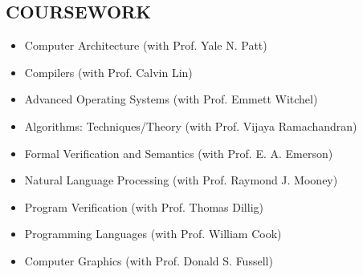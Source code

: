 \documentclass[margin, 9pt]{res} %
\begin{document}
\begin{resume}

\section{COURSEWORK} 

\vspace*{-2pt}
\begin{itemize}[leftmargin=*] \itemsep -2pt
	\item Computer Architecture (with Prof. Yale N. Patt)
	\item Compilers (with Prof. Calvin Lin)
	\item Advanced Operating Systems (with Prof. Emmett Witchel)
	\item Algorithms: Techniques/Theory (with Prof. Vijaya Ramachandran)
	\item Formal Verification and Semantics (with Prof. E. A. Emerson)
	\item Natural Language Processing (with Prof. Raymond J. Mooney)
	\item Program Verification (with Prof. Thomas Dillig)
	\item Programming Languages (with Prof. William Cook)
	\item Computer Graphics (with Prof. Donald S. Fussell)
\end{itemize}


\end{resume}
\end{document}
